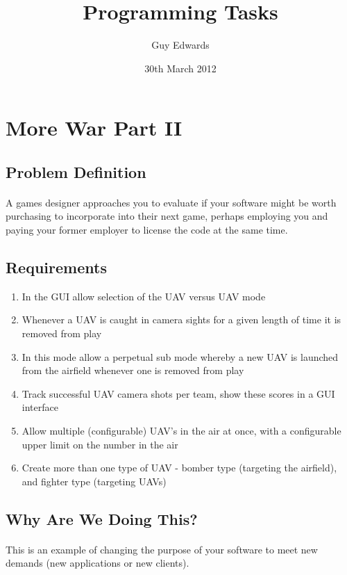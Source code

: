 \documentclass[11pt]{book}
\title{\textbf{Programming Tasks}}
\author{Guy Edwards}
\date{30th March 2012}
\begin{document}
\section{More War Part II}

\subsection{Problem Definition}

\paragraph{} A games designer approaches you to evaluate if your software might be worth purchasing to incorporate into their next game, perhaps employing you and paying your former employer to license the code at the same time.

\subsection{Requirements}

\begin{enumerate}
\item In the GUI allow selection of the UAV versus UAV mode
\item Whenever a UAV is caught in camera sights for a given length of time it is removed from play
\item In this mode allow a perpetual sub mode whereby a new UAV is launched from the airfield whenever one is removed from play
\item Track successful UAV camera shots per team, show these scores in a GUI interface
\item Allow multiple (configurable) UAV's in the air at once, with a configurable upper limit on the number in the air
\item Create more than one type of UAV - bomber type (targeting the airfield), and fighter type (targeting UAVs)
\end{enumerate}

\subsection{Why Are We Doing This?}

\paragraph{} This is an example of changing the purpose of your software to meet new demands (new applications or new clients).
\end{document}
